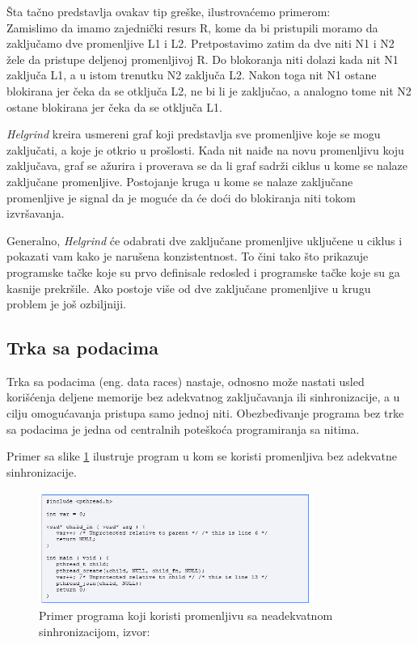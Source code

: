 \documentclass[12pt,oneside]{memoir}
\theoremstyle{plain}
\theoremstyle{definition}
\begin{document}
Šta tačno predstavlja ovakav tip greške, ilustrovaćemo primerom:\\
Zamislimo da imamo zajednički resurs R, kome da bi pristupili moramo da zaključamo dve promenljive L1 i L2. Pretpostavimo zatim da dve niti N1 i N2 žele da pristupe deljenoj promenljivoj R. Do blokoranja niti dolazi kada nit N1 zaključa L1, a u istom trenutku N2 zaključa L2. Nakon toga nit N1 ostane blokirana jer čeka da se otključa L2, ne bi li je zaključao, a analogno tome nit N2 ostane blokirana jer čeka da se otključa L1.

\textit{Helgrind} kreira usmereni graf koji predstavlja sve promenljive koje se mogu zaključati, a koje je otkrio u prošlosti. Kada nit naiđe na novu promenljivu koju zaključava, graf se ažurira i proverava se da li graf sadrži ciklus u kome se nalaze zaključane promenljive. Postojanje kruga u kome se nalaze zaključane promenljive je signal da je moguće da će doći do blokiranja niti tokom izvršavanja.

Generalno, \textit{Helgrind} će odabrati dve zaključane promenljive uključene u ciklus i pokazati vam kako je narušena konzistentnost. To čini tako što prikazuje programske tačke koje su prvo definisale redosled i programske tačke koje su ga kasnije prekršile. Ako postoje više od dve zaključane promenljive u krugu problem je još ozbiljniji.


\subsection{Trka sa podacima}
Trka sa podacima (eng. data races) nastaje, odnosno može nastati usled korišćenja deljene memorije bez adekvatnog zaključavanja ili sinhronizacije, a u cilju omogućavanja pristupa samo jednoj niti. Obezbeđivanje programa bez trke sa podacima je jedna od centralnih poteškoća programiranja sa nitima. 

Primer sa slike \ref{fig:slika2.20} ilustruje program u kom se koristi promenljiva bez adekvatne sinhronizacije.
\begin{figure}[!ht]
  \centering
  \includegraphics[width=0.8\textwidth]{DataRace.png}
  \caption{Primer programa koji koristi promenljivu sa neadekvatnom sinhronizacijom, izvor: \cite{Helgrind}}
  \label{fig:slika2.20}
\end{figure}
\end{document}
